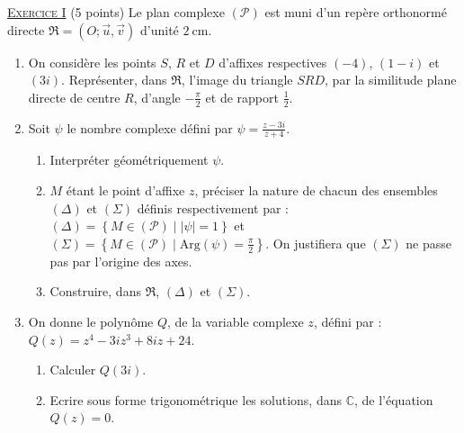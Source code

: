 \providecommand{\Courbe}{(\mathscr{C})}
\providecommand{\D}{(\mathscr{D})}
\providecommand{\Plan}{(\mathscr{P})}
\providecommand{\Ouv}{(O ; \vec{u} , \vec{v})}
\providecommand{\cm}{~\mathrm{cm}}
\providecommand{\dx}{~\mathrm{d}x}
\providecommand{\Arg}[1]{\mathrm{Arg}\left( #1 \right)}

\noindent \underline{\textsc{Exercice I}} (5 points) \newline
      Le plan complexe $\Plan$ est muni d'un rep\`ere orthonorm\'e directe $\mathfrak{R} = \Ouv$ d'unit\'e $2\cm$.
      \begin{enumerate}
            \item On consid\`ere les points $S$, $R$ et $D$ d'affixes respectives $(-4)$, $(1-i)$ et $(3i)$.
                  Repr\'esenter, dans $\mathfrak{R}$, l'image du triangle $SRD$, par la similitude plane directe 
                  de centre $R$, d'angle $-\frac{\pi}{2}$ et de rapport $\frac{1}{2}$.
            \item Soit $\psi$ le nombre complexe d\'efini par $\psi = \frac{z-3i}{z+4}$.
                  \begin{enumerate}
                        \item Interpr\'eter g\'eom\'etriquement $\psi$.
                        \item $M$ \'etant le point d'affixe $z$, pr\'eciser la nature de chacun des ensembles $(\Delta)$
                              et $(\Sigma)$ d\'efinis respectivement par : 
                              $
                                    (\Delta) = \left\lbrace M \in \Plan \mid |\psi| = 1 \right\rbrace
                              $
                              et 
                              $ 
                                    (\Sigma) = \left\lbrace M \in \Plan \mid \Arg{\psi} = \frac{\pi}{2} \right\rbrace
                                    .
                              $
                              On justifiera que $(\Sigma)$ ne passe pas par l'origine des axes.
                        \item Construire, dans $\mathfrak{R}$, $(\Delta)$ et $(\Sigma)$.
                  \end{enumerate}
            \item On donne le polyn\^ome $Q$, de la variable complexe $z$, d\'efini par : 
                  $Q(z) = z^4 - 3i z^3 + 8iz + 24$.
                  \begin{enumerate}
                        \item Calculer $Q(3i)$.
                        \item Ecrire sous forme trigonom\'etrique les solutions, dans $\mathbb{C}$, de l'\'equation $Q(z)=0$.
                  \end{enumerate}
      \end{enumerate}

